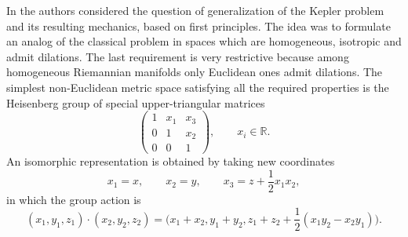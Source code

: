\documentclass[pdftex]{sigma}
\numberwithin{equation}{section}
\begin{document}
In \cite{1} the authors considered the question of generalization of
the Kepler problem and its resulting mechanics, based on first principles. The idea was to
formulate an analog of the classical problem in spaces which are
homogeneous, isotropic and admit dilations. The last requirement is
very restrictive because among homogeneous Riemannian manifolds only
Euclidean ones admit dilations. The simplest non-Euclidean metric
space satisfying all the required properties is the Heisenberg group
of special upper-triangular matrices
\begin{equation*}
 \begin{pmatrix}
 1 & x_1 & x_3 \\ 0 & 1 & x_2 \\ 0 & 0 & 1
 \end{pmatrix}\!,
 \qquad x_i\in\mathbb{R}.
\end{equation*}
An isomorphic representation is obtained by taking new coordinates
\begin{equation*}
 x_1 = x, \qquad x_2 = y, \qquad x_3 = z +\frac12 x_1 x_2,
\end{equation*}
in which the group action is
\begin{equation}
 (x_1,y_1,z_1)\cdot(x_2,y_2,z_2)=\bigg(x_1+x_2,y_1+y_2,z_1+z_2+\frac12(x_1 y_2-x_2 y_1)\bigg).
 \label{groupop}
\end{equation}
\end{document}
